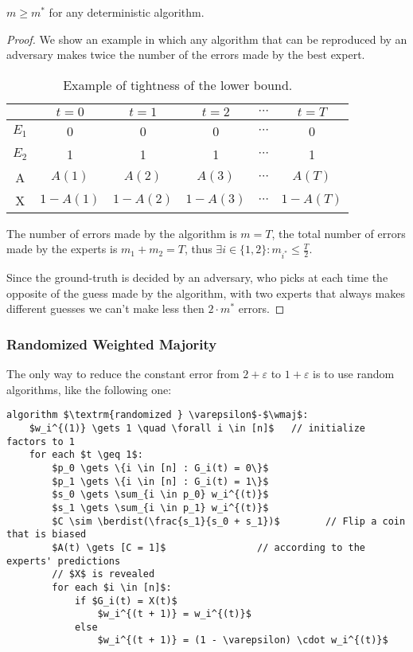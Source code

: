 \begin{theorem}\label{thm:exp-lb}
    $m \geq m^*$ for any deterministic algorithm.
\end{theorem}
\begin{proof}
    We show an example in which any algorithm that can be reproduced by an adversary makes twice the number of the errors made by the best expert.
    
    \begin{table}[h!]
        \centering
        \begin{tabular}{c|c|c|c|c|c}
            & $t=0$    & $t=1$    & $t=2$    & $\cdots$ & $t=T$    \\ \hline
            $E_1$ & 0        & 0        & 0        & $\cdots$ & 0        \\
            $E_2$ & 1        & 1        & 1        & $\cdots$ & 1        \\
            A     & $A(1)$   & $A(2)$   & $A(3)$   & $\cdots$ & $A(T)$   \\
            X     & $1-A(1)$ & $1-A(2)$ & $1-A(3)$ & $\cdots$ & $1-A(T)$
        \end{tabular}
        \caption{Example of tightness of the lower bound.}
        \label{tab:exp-lb}
    \end{table}

    The number of errors made by the algorithm is $m = T$, the total number of errors made by the experts is $m_1 + m_2 = T$, thus $\exists i \in \{1,2\} : m_{i^*} \leq \frac{T}{2}$.

    Since the ground-truth is decided by an adversary, who picks at each time the opposite of the guess made by the algorithm, with two experts that always makes different guesses we can't make less then $2 \cdot m^*$ errors.
\end{proof}


\subsubsection{Randomized Weighted Majority}

The only way to reduce the constant error from $2 + \varepsilon$ to $1 + \varepsilon$ is to use random algorithms, like the following one:
\begin{lstlisting}[caption={Randomized Weighted Majority}, label={lst:exp-rwm}]
algorithm $\textrm{randomized } \varepsilon$-$\wmaj$:
    $w_i^{(1)} \gets 1 \quad \forall i \in [n]$   // initialize factors to 1
    for each $t \geq 1$:
        $p_0 \gets \{i \in [n] : G_i(t) = 0\}$
        $p_1 \gets \{i \in [n] : G_i(t) = 1\}$
        $s_0 \gets \sum_{i \in p_0} w_i^{(t)}$
        $s_1 \gets \sum_{i \in p_1} w_i^{(t)}$
        $C \sim \berdist(\frac{s_1}{s_0 + s_1})$        // Flip a coin that is biased
        $A(t) \gets [C = 1]$                // according to the experts' predictions
        // $X$ is revealed
        for each $i \in [n]$:
            if $G_i(t) = X(t)$
                $w_i^{(t + 1)} = w_i^{(t)}$
            else
                $w_i^{(t + 1)} = (1 - \varepsilon) \cdot w_i^{(t)}$
\end{lstlisting}

